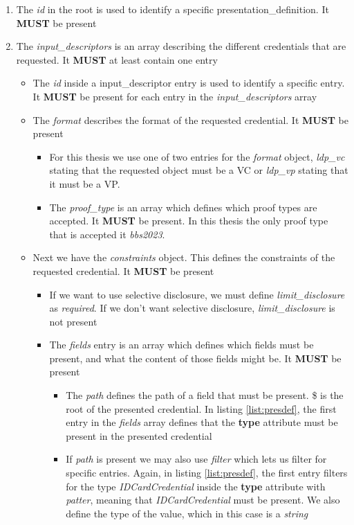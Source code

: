 \documentclass[
	a4paper               %
	,bibliography=totoc   %
	,listof=totoc         %
	,monolingual
	twoside=false,
]{bfhthesis}              %
\begin{document}
\begin{enumerate}
	\item The \textit{id} in the root is used to identify a specific presentation\_definition. It \textbf{MUST} be present
	\item The \textit{input\_descriptors} is an array describing the different credentials that are requested. It \textbf{MUST} at least contain one entry
	\begin{itemize}
		\item The \textit{id} inside a input\_descriptor entry is used to identify a specific entry. It \textbf{MUST} be present for each entry in the \textit{input\_descriptors} array
		\item The \textit{format} describes the format of the requested credential. It \textbf{MUST} be present
		\begin{itemize}
			\item For this thesis we use one of two entries for the \textit{format} object, \textit{ldp\_vc} stating that the requested object must be a VC or \textit{ldp\_vp} stating that it must be a VP.
			\item The \textit{proof\_type} is an array which defines which proof types are accepted. It \textbf{MUST} be present. In this thesis the only proof type that is accepted it \textit{bbs2023}.
		\end{itemize}
		\item Next we have the \textit{constraints} object. This defines the constraints of the requested credential. It \textbf{MUST} be present
		\begin{itemize}
			\item If we want to use selective disclosure, we must define \textit{limit\_disclosure} as \textit{required}. If we don't want selective disclosure, \textit{limit\_disclosure} is not present
			\item The \textit{fields} entry is an array which defines which fields must be present, and what the content of those fields might be. It \textbf{MUST} be present
			\begin{itemize}
				\item The \textit{path} defines the path of a field that must be present. \$ is the root of the presented credential. In listing \ref{list:presdef}, the first entry in the \textit{fields} array defines that the \textbf{type} attribute must be present in the presented credential
				\item If \textit{path} is present we may also use \textit{filter} which lets us filter for specific entries. Again, in listing \ref{list:presdef}, the first entry filters for the type \textit{IDCardCredential} inside the \textbf{type} attribute with \textit{patter}, meaning that \textit{IDCardCredential} must be present. We also define the type of the value, which in this case is a \textit{string}

\end{itemize}
\end{itemize}
\end{itemize}
\end{enumerate}
\end{document}
